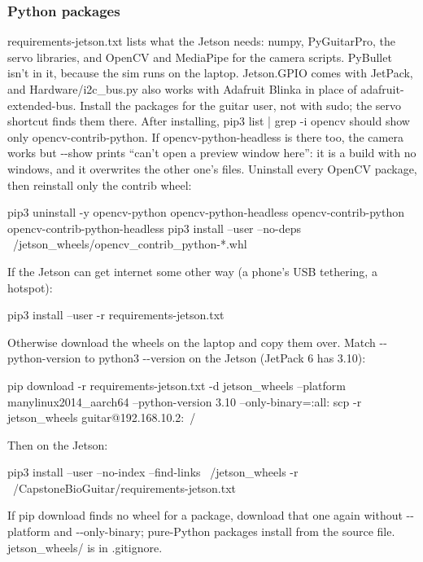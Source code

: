 \documentclass[11pt,letterpaper]{article}
\newcommand{\code}[1]{\textcolor{codeblue}{\ttfamily\smaller\relax #1}}
\begin{document}
\subsubsection*{Python packages}
\code{requirements-{}\allowbreak{}jetson.txt} lists what the Jetson needs: \code{numpy}, \code{PyGuitarPro}, the servo libraries, and OpenCV and MediaPipe for the camera scripts. PyBullet isn't in it, because the sim runs on the laptop. \code{Jetson.GPIO} comes with JetPack, and \code{Hardware/\allowbreak{}i2c\_\allowbreak{}bus.py} also works with Adafruit Blinka in place of \code{adafruit-{}\allowbreak{}extended-{}\allowbreak{}bus}. Install the packages for the \code{guitar} user, not with sudo; the \code{servo} shortcut finds them there. After installing, \code{pip3 list | grep -{}i opencv} should show only \code{opencv-{}\allowbreak{}contrib-{}\allowbreak{}python}. If \code{opencv-{}\allowbreak{}python-{}\allowbreak{}headless} is there too, the camera works but \code{-{}-{}show} prints ``can't open a preview window here'': it is a build with no windows, and it overwrites the other one's files. Uninstall every OpenCV package, then reinstall only the contrib wheel:
\begin{codeblock}
pip3 uninstall -y opencv-python opencv-python-headless opencv-contrib-python opencv-contrib-python-headless
pip3 install --user --no-deps ~/jetson_wheels/opencv_contrib_python-*.whl
\end{codeblock}


If the Jetson can get internet some other way (a phone's USB tethering, a hotspot):

\begin{codeblock}
pip3 install --user -r requirements-jetson.txt
\end{codeblock}
Otherwise download the wheels on the laptop and copy them over. Match \code{-{}-{}python-{}\allowbreak{}version} to \code{python3 -{}-{}version} on the Jetson (JetPack 6 has 3.10):

\begin{codeblock}
pip download -r requirements-jetson.txt -d jetson_wheels --platform manylinux2014_aarch64 --python-version 3.10 --only-binary=:all:
scp -r jetson_wheels guitar@192.168.10.2:~/
\end{codeblock}
Then on the Jetson:

\begin{codeblock}
pip3 install --user --no-index --find-links ~/jetson_wheels -r ~/CapstoneBioGuitar/requirements-jetson.txt
\end{codeblock}
If \code{pip download} finds no wheel for a package, download that one again without \code{-{}-{}platform} and \code{-{}-{}only-{}\allowbreak{}binary}; pure-Python packages install from the source file. \code{jetson\_\allowbreak{}wheels/\allowbreak{}} is in \code{.gitignore}.
\end{document}
